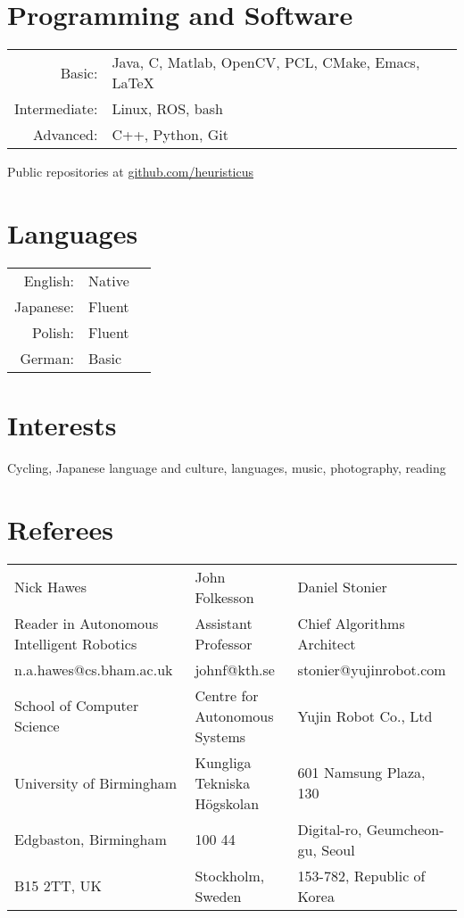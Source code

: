 \documentclass[a4paper,10pt]{article}
\begin{document}
\begin{minipage}[t]{0.47\textwidth}
  \section{Programming and Software}
  \begin{tabular}{rp{}}
    Basic:& Java, C, Matlab, OpenCV, PCL, CMake, Emacs, \LaTeX\\
    Intermediate:& Linux, ROS, bash\\
    Advanced:& C++, Python, Git
  \end{tabular}
  \vskip 0.2cm
  \centering
  Public repositories at \href{http://www.github.com/heuristicus}{github.com/heuristicus}
\end{minipage}
\textwidth
\begin{minipage}[t]{0.47\textwidth}
  \section{Languages}
  \begin{tabular}{rlr}%
    English:&Native\\
    Japanese:&Fluent\\
    Polish:&Fluent\\
    German:&Basic
  \end{tabular}
\end{minipage}

\section{Interests}
Cycling, Japanese language and culture, languages, music, photography, reading

\section{Referees}
\begin{center}
  \begin{tabular}{lll}
  Nick Hawes& John Folkesson & Daniel Stonier \\
  Reader in Autonomous Intelligent Robotics & Assistant Professor & Chief Algorithms Architect\\
  n.a.hawes@cs.bham.ac.uk & johnf@kth.se & stonier@yujinrobot.com\\
  School of Computer Science& Centre for Autonomous Systems & Yujin Robot Co., Ltd  \rule{0pt}{0.6cm} \\
  University of Birmingham& Kungliga Tekniska H\"{o}gskolan & 601 Namsung Plaza, 130  \\
  Edgbaston, Birmingham & 100 44 & Digital-ro, Geumcheon-gu, Seoul \\
  B15 2TT, UK& Stockholm, Sweden & 153-782, Republic of Korea
\end{tabular}
\end{center}
\end{document}

